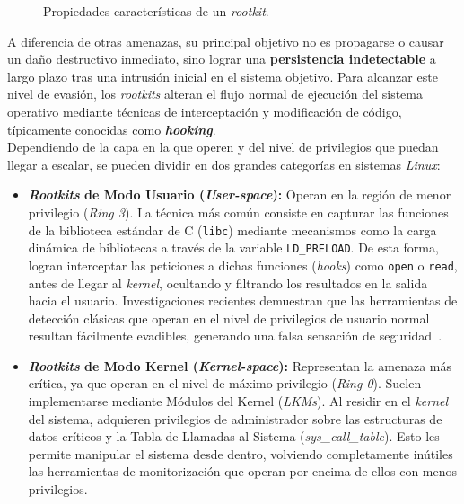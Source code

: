 \begin{figure}[h!]
  \centering
  \makebox[\textwidth][c]{\scalebox{1.2}{}}
  \caption{Propiedades características de un \textit{rootkit}.}
  \label{fig:rootkits_layers}
\end{figure}

A diferencia de otras amenazas, su principal objetivo no es propagarse o causar un daño destructivo inmediato, sino lograr una \textbf{persistencia indetectable} a largo plazo tras una intrusión inicial en el sistema objetivo.
Para alcanzar este nivel de evasión, los \textit{rootkits} alteran el flujo normal de ejecución del sistema operativo mediante técnicas de interceptación y modificación de código, típicamente conocidas como \textbf{\textit{hooking}}.\\

Dependiendo de la capa en la que operen y del nivel de privilegios que puedan llegar a escalar, se pueden dividir en dos grandes categorías en sistemas \textit{Linux}:
\begin{itemize}
    \item \textbf{\textit{Rootkits} de Modo Usuario (\textit{User-space}):} Operan en la región de menor privilegio (\textit{Ring 3}).
    La técnica más común consiste en capturar las funciones de la biblioteca estándar de C (\texttt{libc}) mediante mecanismos como la carga dinámica de bibliotecas a través de la variable \texttt{LD\_PRELOAD}.
    De esta forma, logran interceptar las peticiones a dichas funciones (\textit{hooks}) como \texttt{open} o \texttt{read}, antes de llegar al \textit{kernel}, ocultando y filtrando los resultados en la salida hacia el usuario.
    Investigaciones recientes demuestran que las herramientas de detección clásicas que operan en el nivel de privilegios de usuario normal resultan fácilmente evadibles, generando una falsa sensación de seguridad~\cite{rootkits}.
    
    \item \textbf{\textit{Rootkits} de Modo Kernel (\textit{Kernel-space}):} Representan la amenaza más crítica, ya que operan en el nivel de máximo privilegio (\textit{Ring 0}).
    Suelen implementarse mediante Módulos del Kernel (\textit{LKMs}). Al residir en el \textit{kernel} del sistema, adquieren privilegios de administrador sobre las estructuras de datos críticos y la Tabla de Llamadas al Sistema (\textit{sys\_call\_table}).
    Esto les permite manipular el sistema desde dentro, volviendo completamente inútiles las herramientas de monitorización que operan por encima de ellos con menos privilegios.
\end{itemize}

